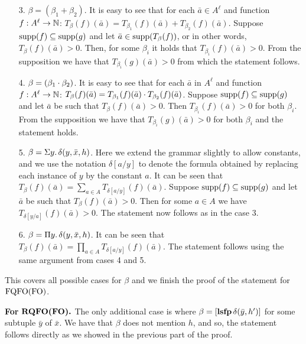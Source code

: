 \begin{itemize}
\item[3.] $\beta = (\beta_1 + \beta_2)$. It is easy to see that for each $\bar{a} \in A^{\ell}$ and function $f:A^{\ell}\to\mathbb{N}$: $T_{\beta}(f)(\bar{a}) = T_{\beta_1}(f)(\bar{a}) + T_{\beta_2}(f)(\bar{a})$. Suppose $\text{\rm supp}(f)\subseteq\text{\rm supp}(g)$ and let $\bar{a} \in \text{\rm supp}(T_{\beta}(f))$, or in other words, $T_{\beta}(f)(\bar{a}) > 0$. Then, for some $\beta_i$ it holds that $T_{\beta_i}(f)(\bar{a}) > 0$. From the supposition we have that $T_{\beta_i}(g)(\bar{a}) > 0$ from which the statement follows.
\item[4.] $\beta = (\beta_1 \cdot \beta_2)$. It is easy to see that for each $\bar{a}$ in $A^{\ell}$ and function $f:A^{\ell}\to\mathbb{N}$: $T_{\beta}(f)(\bar{a}) = T_{\beta_1}(f)(\bar{a}) \cdot T_{\beta_2}(f)(\bar{a})$. Suppose $\text{\rm supp}(f)\subseteq\text{\rm supp}(g)$ and let $\bar{a}$ be such that $T_{\beta}(f)(\bar{a}) > 0$. Then $T_{\beta_i}(f)(\bar{a}) > 0$ for both $\beta_i$. From the supposition we have that $T_{\beta_i}(g)(\bar{a}) > 0$ for both $\beta_i$ and the statement holds.
\item[5.] $\beta = \Sigma{y}.\,\delta(y,\bar{x},h)$. Here we extend the grammar slightly to allow constants, and we use the notation $\delta[a/y]$ to denote the formula obtained by replacing each instance of $y$ by the constant $a$. It can be seen that $T_{\beta}(f)(\bar{a}) = \sum_{a \in A} T_{\delta[a/y]}(f)(\bar{a})$. Suppose $\text{\rm supp}(f)\subseteq\text{\rm supp}(g)$ and let $\bar{a}$ be such that $T_{\beta}(f)(\bar{a}) > 0$. Then for some $a\in A$ we have $T_{\delta[y/a]}(f)(\bar{a}) > 0$. The statement now follows as in the case 3.
\item[6.] $\beta = \Pi{y}.\,\delta(y,\bar{x},h)$. 
It can be seen that $T_{\beta}(f)(\bar{a}) = \prod_{a \in A} T_{\delta[a/y]}(f)(\bar{a})$. 
The statement follows using the same argument from cases 4 and 5.
\end{itemize}
This covers all possible cases for $\beta$ and we finish the proof of the statement for ${\rm FQFO}({\rm FO})$.

\vspace{1em}
{\bf For} $\boldsymbol{{\rm RQFO}({\rm FO}).}$ The only additional case is where $\beta = [{\bf lsfp} \, \delta(\bar{y},h')]$ for some subtuple $\bar{y}$ of $\bar{x}$. We have that $\beta$ does not mention $h$, and so, the statement follows directly as we showed in the previous part of the proof.


